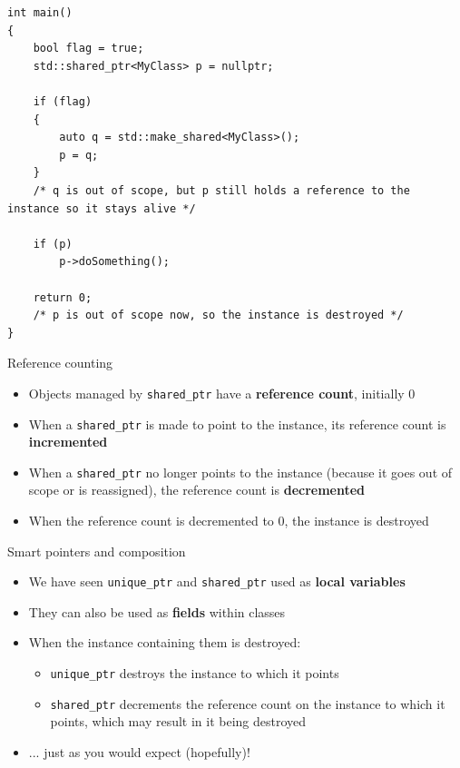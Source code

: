 \begin{frame}[fragile]
    \begin{lstlisting}
int main()
{
	bool flag = true;
	std::shared_ptr<MyClass> p = nullptr;
	
	if (flag)
	{
		auto q = std::make_shared<MyClass>();
		p = q;
	}
    /* q is out of scope, but p still holds a reference to the instance so it stays alive */
    
    if (p)
        p->doSomething();
    
    return 0;
    /* p is out of scope now, so the instance is destroyed */
}
    \end{lstlisting}
\end{frame}

\begin{frame}{Reference counting}
    \begin{itemize}
        \item Objects managed by \lstinline{shared_ptr} have a \textbf{reference count}, initially 0 \pause
        \item When a \lstinline{shared_ptr} is made to point to the instance,
            its reference count is \textbf{incremented} \pause
        \item When a \lstinline{shared_ptr} no longer points to the instance
            (because it goes out of scope or is reassigned),
            the reference count is \textbf{decremented} \pause
        \item When the reference count is decremented to 0,
            the instance is destroyed
    \end{itemize}
\end{frame}

\begin{frame}{Smart pointers and composition}
    \begin{itemize}
        \item We have seen \lstinline{unique_ptr} and \lstinline{shared_ptr} used as
            \textbf{local variables} \pause
        \item They can also be used as \textbf{fields} within classes \pause
        \item When the instance containing them is destroyed: \pause
            \begin{itemize}
                \item \lstinline{unique_ptr} destroys the instance to which it points \pause
                \item \lstinline{shared_ptr} decrements the reference count on the instance 
                    to which it points, which may result in it being destroyed \pause
            \end{itemize}
        \item ... just as you would expect (hopefully)!
    \end{itemize}
\end{frame}


